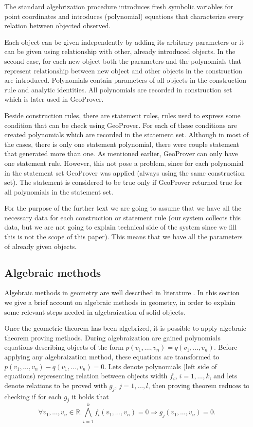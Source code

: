 \documentclass[final,1p,times,authoryear]{elsarticle}
\begin{document}
The standard algebrization procedure introduces fresh symbolic
variables for point coordinates and introduces (polynomial) equations
that characterize every relation between objected observed.


Each object can be given independently by adding its arbitrary
parameters or it can be given using relationship with other, already
introduced objects. In the second case, for each new object both the
parameters and the polynomials that represent relationship between new
object and other objects in the construction are
introduced. Polynomials contain parameters of all objects in the
construction rule and analytic identities. All polynomials are
recorded in construction set which is later used in GeoProver.

Beside construction rules, there are statement rules, rules used to
express some condition that can be check using GeoProver. For each of
these conditions are created polynomials which are recorded in the
statement set. Although in most of the cases, there is only one
statement polynomial, there were couple statement that generated more
than one. As mentioned earlier, GeoProver can only have one statement
rule. However, this not pose a problem, since for each polynomial in
the statement set GeoProver was applied (always using the same
construction set). The statement is considered to be true only if
GeoProver returned true for all polynomials in the statement set.

For the purpose of the further text we are going to assume that we
have all the necessary data for each construction or statement rule
(our system collects this data, but we are not going to explain
technical side of the system since we fill this is not the scope of
this paper). This means that we have all the parameters of already
given objects.

\subsection{Algebraic methods}

Algebraic methods in geometry are well described in literature
\cite{wu, buchberger}. In this section we give a brief account on
algebraic methods in geometry, in order to explain some relevant steps
needed in algebraization of solid objects.


Once the geometric theorem has been algebrized, it is possible to
apply algebraic theorem proving methods. During algebraization are
gained polynomials equations describing objects of the form $p(v_1,
\ldots, v_n) = q(v_1, \ldots, v_n)$. Before applying any
algebraization method, these equations are transformed to $p(v_1,
\ldots, v_n) - q(v_1, \ldots, v_n) = 0$. Lets denote polynomials (left
side of equations) representing relation between objects width $f_i$,
$i = 1, \ldots, k$, and lets denote relations to be proved with $g_j$,
$j = 1, \ldots, l$, then proving theorem reduces to checking if for
each $g_j$ it holds that
$$\forall v_1, \ldots, v_n \in \mathbb{R}. \bigwedge_{i = 1}^{k} f_i(v_1, \ldots, v_n) = 0 \Longrightarrow g_j(v_1, \ldots, v_n) = 0.$$
\end{document}
